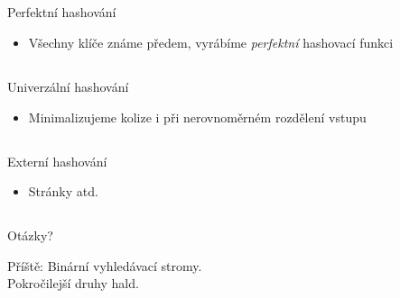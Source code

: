 \documentclass{beamer}
\begin{document}
\subsection{}
\begin{frame}{Perfektní hashování}
\begin{itemize}
\item Všechny klíče známe předem, vyrábíme {\em perfektní} hashovací funkci
\end{itemize}
\end{frame}

\subsection{}
\begin{frame}{Univerzální hashování}
\begin{itemize}
\item Minimalizujeme kolize i při nerovnoměrném rozdělení vstupu
\end{itemize}
\end{frame}

\subsection{}
\begin{frame}{Externí hashování}
\begin{itemize}
\item Stránky atd.
\end{itemize}
\end{frame}

\subsection{}
\begin{frame}{Otázky?}
\begin{center}
Příště: Binární vyhledávací stromy. \\ Pokročilejší druhy hald.
\end{center}
\end{frame}

\subsection{}
\end{document}
